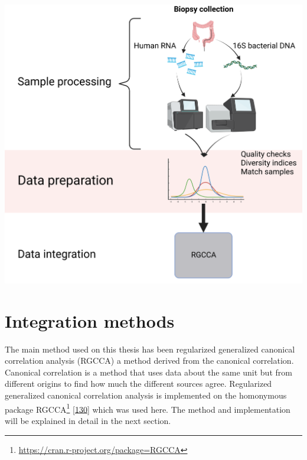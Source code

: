 \documentclass[
  12pt,
  a4paper,
  twoside,
  openright]{book}
\DeclareRobustCommand{\href}[2]{#2\footnote{\url{#1}}}
\let\origfigure\figure
\let\endorigfigure\endfigure
\renewenvironment{figure}[1][2] {
    \expandafter\origfigure\expandafter[!ht]
} {
    \endorigfigure
}
\begin{document}
\begin{figure}
\includegraphics[width=1\linewidth]{images/workflow_integration2} \caption[Workflow of the analysis process.]{Workflow of the main analysis process of the thesis. Created with BioRender.com}\label{fig:workflow-process}
\end{figure}

\hypertarget{integration-methods}{%
\section{Integration methods}\label{integration-methods}}

The main method used on this thesis has been regularized generalized canonical correlation analysis (RGCCA) a method derived from the canonical correlation.
Canonical correlation is a method that uses data about the same unit but from different origins to find how much the different sources agree.
Regularized generalized canonical correlation analysis is implemented on the homonymous package \href{https://cran.r-project.org/package=RGCCA}{RGCCA} {[}\protect\hyperlink{ref-tenenhaus2017}{130}{]} which was used here.
The method and implementation will be explained in detail in the next section.
\end{document}
